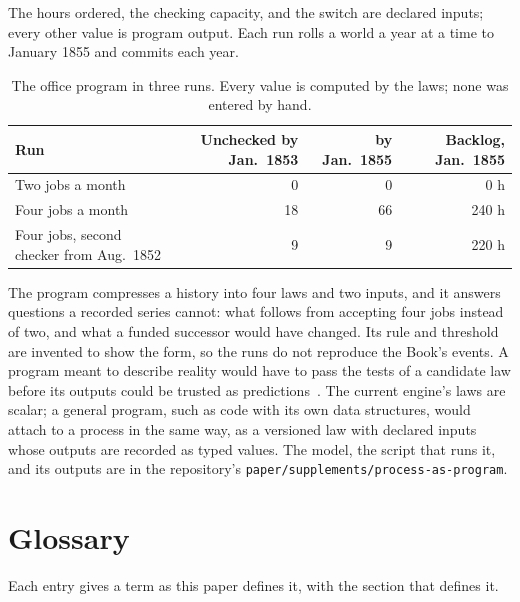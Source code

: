 \documentclass[11pt,a4paper]{article}
\begin{document}
The hours ordered, the checking capacity, and the switch are declared inputs;
every other value is program output. Each run rolls a world a year at a time to
January 1855 and commits each year.

\begin{table}[htbp]
\centering
\small
\begin{tabular}{lrrr}
\toprule
Run & Unchecked by Jan.\ 1853 & by Jan.\ 1855 & Backlog, Jan.\ 1855 \\
\midrule
Two jobs a month & 0 & 0 & 0 h \\
Four jobs a month & 18 & 66 & 240 h \\
Four jobs, second checker from Aug.\ 1852 & 9 & 9 & 220 h \\
\bottomrule
\end{tabular}
\caption{The office program in three runs. Every value is computed by the
laws; none was entered by hand.}
\label{tab:process-as-program}
\end{table}

The program compresses a history into four laws and two inputs, and it answers
questions a recorded series cannot: what follows from accepting four jobs
instead of two, and what a funded successor would have changed. Its rule and
threshold are invented to show the form, so the runs do not reproduce the
Book's events. A program meant to describe reality would have to pass the tests
of a candidate law before its outputs could be trusted as
predictions~\cite{westerbergLifeSimulation2026}. The current engine's laws are
scalar; a general program, such as code with its own data structures, would
attach to a process in the same way, as a versioned law with declared inputs
whose outputs are recorded as typed values. The model, the script that runs it,
and its outputs are in the repository's
\texttt{paper/supplements/process-as-program}.

\section{Glossary}
\label{app:glossary}

Each entry gives a term as this paper defines it, with the section that defines
it.
\end{document}
